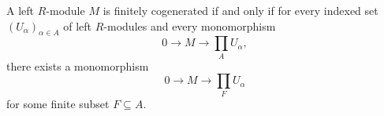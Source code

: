 A left $R$-module $M$ is finitely cogenerated if and only if for every indexed set $(U_\alpha)_{\alpha \in A}$ of left $R$-modules and every monomorphism
$$0 \to M \to \prod_A U_\alpha,$$
there exists a monomorphism
$$0 \to M \to \prod_F U_\alpha$$
for some finite subset $F \subseteq A$.
